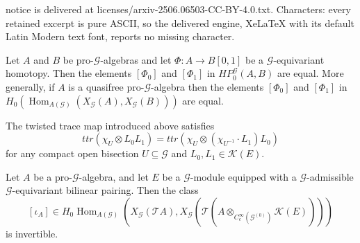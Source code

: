 \documentclass[10pt,a4paper]{amsart}
\DeclareMathOperator{\Hom}{Hom}
\newcommand{\G}{\mathcal{G}}
\newcommand{\K}{\mathcal{K}}
\newcommand{\T}{\mathcal{T}}
\newcommand{\ccinfty}{C_c^\infty}
\begin{document}
notice is delivered at licenses/arxiv-2506.06503-CC-BY-4.0.txt. Characters: every retained excerpt is pure ASCII, so the delivered engine, XeLaTeX with its default Latin Modern text font, reports no missing character.
\begin{thm} \label{thm: homotopy invariance}
Let $ A $ and $ B $ be pro-$ \G $-algebras and let $ \Phi: A \rightarrow B[0,1] $ be a $ \G $-equivariant homotopy. Then the elements $ \left[\Phi_0\right] $ and $ \left[\Phi_1\right] $ in $ HP_0^\G(A,B) $ are equal. More generally, if $ A $ is a quasifree pro-$ \G $-algebra then the elements $ \left[\Phi_0\right] $ and $ \left[\Phi_1\right] $ 
in $ H_0(\Hom_{A(\G)}(X_\G(A), X_\G(B))) $ are equal.    
\end{thm}

\begin{lemma} \label{twistedtrace}
The twisted trace map introduced above satisfies
$$
ttr(\chi_U \otimes L_0 L_1) = ttr(\chi_U \otimes (\chi_{U^{-1}}\cdot L_1) L_0)
$$
for any compact open bisection $ U \subseteq \G $ and $ L_0, L_1 \in \K(E) $.  
\end{lemma}

\begin{thm} \label{StabLemma} 
Let $ A $ be a pro-$ \G $-algebra, and let $ E $ be a $ \G $-module equipped with a $ \G $-admissible $ \G $-equivariant bilinear pairing. Then the class 
$$
[\iota_A] \in H_0 \Hom_{A(\G)}(X_\G(\T A), X_\G(\T(A \otimes_{\ccinfty(\G^{(0)})} \K(E)))) 
$$
is invertible.
\end{thm}
\end{document}
